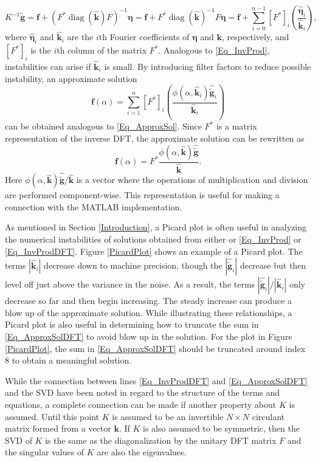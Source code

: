 \documentclass[12pt]{article}
\newcommand{\gnoise}{\widetilde{\mathbf{g}}}
\newcommand{\kdis}{\mathbf{k}}
\newcommand{\kmat}{K}	%
\newcommand{\fdis}{\mathbf{f}}
\newcommand{\diag}{\operatorname{diag}}
\newcommand{\regparam}{\alpha}
\newcommand{\filt}{\phi}
\newcommand{\noise}{\bm{\eta}}	%
\begin{document}
\begin{equation}
\kmat^{-1}\gnoise = \fdis + (F^*\diag(\widehat{\kdis})F)^{-1}\noise = \fdis + F^*\diag(\widehat{\kdis})^{-1}F\noise = \fdis + \sum_{i = 0}^{n-1} [F^*]_i\left(\frac{\widehat{\noise}_i}{\widehat{\kdis}_i}\right),
\label{Eq_InvProdDFT}
\end{equation}
where $\widehat{\noise}_i$ and $\widehat{\kdis}_i$ are the $i$th Fourier coefficients of $\noise$ and $\kdis$, respectively, and $[F^*]_i$ is the $i$th column of the matrix $F^*$. Analogous to \eqref{Eq_InvProd}, instabilities can arise if $\widehat{\kdis}_i$ is small. By introducing filter factors to reduce possible instability, an approximate solution
\begin{equation}
\fdis(\regparam) = \sum_{i = 1}^n [F^*]_i\left(\frac{\filt(\regparam,\widehat{\kdis}_i)\widehat{\gnoise}_i}{\widehat{\kdis}_i}\right)
\label{Eq_ApproxSolDFT}
\end{equation}
can be obtained analogous to \eqref{Eq_ApproxSol}. 
Since $F^*$ is a matrix representation of the inverse DFT, the approximate solution can be rewritten as
\[\fdis(\regparam) = F^* \frac{\filt(\regparam,\widehat{\kdis})\widehat{\gnoise}}{\widehat{\kdis}}.\]
Here $\filt(\regparam,\widehat{\kdis})\widehat{\gnoise}/{\widehat{\kdis}}$ is a vector where the operations of multiplication and division are performed component-wise. This representation is useful for making a connection with the MATLAB implementation. \par
As mentioned in Section \ref{Introduction}, a Picard plot is often useful in analyzing the numerical instabilities of solutions obtained from either or \eqref{Eq_InvProd} or \eqref{Eq_InvProdDFT}. Figure \ref{PicardPlot} shows an example of a Picard plot. The terms $|\widehat{\kdis}_i|$ decrease down to machine precision, though the $|\widehat{\gnoise}_i|$ decrease but then level off just above the variance in the noise. As a result, the terms $|\widehat{\gnoise}_i|/|\widehat{\kdis}_i|$ only decrease so far and then begin increasing. The steady increase can produce a blow up of the approximate solution. While illustrating these relationships, a Picard plot is also useful in determining how to truncate the sum in \eqref{Eq_ApproxSolDFT} to avoid blow up in the solution. For the plot in Figure \ref{PicardPlot}, the sum in \eqref{Eq_ApproxSolDFT} should be truncated around index 8 to obtain a meaningful solution. \par 
While the connection between lines \eqref{Eq_InvProdDFT} and \eqref{Eq_ApproxSolDFT} and the SVD have been noted in regard to the structure of the terms and equations, a complete connection can be made if another property about $\kmat$ is assumed. Until this point $\kmat$ is assumed to be an invertible $N \times N$ circulant matrix formed from a vector $\kdis$. If $\kmat$ is also assumed to be symmetric, then the SVD of $\kmat$ is the same as the diagonalization by the unitary DFT matrix $F$ and the singular values of $\kmat$ are also the eigenvalues. 
\end{document}
